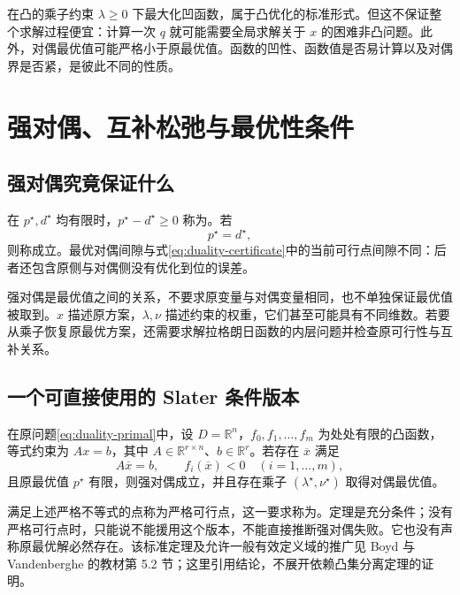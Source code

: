 \documentclass[UTF8]{ctexart}
\begin{document}
在凸的乘子约束 $\lambda\geq0$ 下最大化凹函数，属于凸优化的标准形式。但这不保证整个求解过程便宜：计算一次 $q$ 就可能需要全局求解关于 $x$ 的困难非凸问题。此外，对偶最优值可能严格小于原最优值。函数的凹性、函数值是否易计算以及对偶界是否紧，是彼此不同的性质。

\section{强对偶、互补松弛与最优性条件}
\label{sec:duality-strong}

\subsection{强对偶究竟保证什么}

在 $p^\star,d^\star$ 均有限时，$p^\star-d^\star\geq0$ 称为。若
\begin{equation}
 p^\star=d^\star,
 \label{eq:duality-strong}
\end{equation}
则称成立。最优对偶间隙与式\eqref{eq:duality-certificate}中的当前可行点间隙不同：后者还包含原侧与对偶侧没有优化到位的误差。

强对偶是最优值之间的关系，不要求原变量与对偶变量相同，也不单独保证最优值被取到。$x$ 描述原方案，$\lambda,\nu$ 描述约束的权重，它们甚至可能具有不同维数。若要从乘子恢复原最优方案，还需要求解拉格朗日函数的内层问题并检查原可行性与互补关系。

\subsection{一个可直接使用的 Slater 条件版本}

\begin{theorem}
\label{thm:duality-slater}
在原问题\eqref{eq:duality-primal}中，设 $D=\mathbb R^n$，$f_0,f_1,\ldots,f_m$ 为处处有限的凸函数，等式约束为 $Ax=b$，其中 $A\in\mathbb R^{r\times n}$、$b\in\mathbb R^r$。若存在 $\overline x$ 满足
\[
 A\overline x=b,
 \qquad f_i(\overline x)<0\quad(i=1,\ldots,m),
\]
且原最优值 $p^\star$ 有限，则强对偶成立，并且存在乘子 $(\lambda^\star,\nu^\star)$ 取得对偶最优值。
\end{theorem}

满足上述严格不等式的点称为严格可行点，这一要求称为。定理是充分条件；没有严格可行点时，只能说不能援用这个版本，不能直接推断强对偶失败。它也没有声称原最优解必然存在。该标准定理及允许一般有效定义域的推广见 Boyd 与 Vandenberghe 的教材第 5.2 节\cite{boyd-vandenberghe}；这里引用结论，不展开依赖凸集分离定理的证明。
\end{document}
